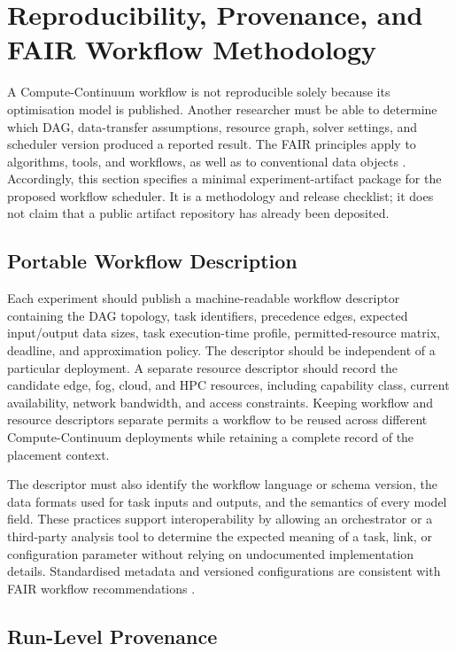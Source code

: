 \section{Reproducibility, Provenance, and FAIR Workflow Methodology}
\label{sec:reproducibility}

A Compute-Continuum workflow is not reproducible solely because its optimisation model is published. Another researcher must be able to determine which DAG, data-transfer assumptions, resource graph, solver settings, and scheduler version produced a reported result. The FAIR principles apply to algorithms, tools, and workflows, as well as to conventional data objects \cite{wilkinson2016fair}. Accordingly, this section specifies a minimal experiment-artifact package for the proposed workflow scheduler. It is a methodology and release checklist; it does not claim that a public artifact repository has already been deposited.

\subsection{Portable Workflow Description}

Each experiment should publish a machine-readable workflow descriptor containing the DAG topology, task identifiers, precedence edges, expected input/output data sizes, task execution-time profile, permitted-resource matrix, deadline, and approximation policy. The descriptor should be independent of a particular deployment. A separate resource descriptor should record the candidate edge, fog, cloud, and HPC resources, including capability class, current availability, network bandwidth, and access constraints. Keeping workflow and resource descriptors separate permits a workflow to be reused across different Compute-Continuum deployments while retaining a complete record of the placement context.

The descriptor must also identify the workflow language or schema version, the data formats used for task inputs and outputs, and the semantics of every model field. These practices support interoperability by allowing an orchestrator or a third-party analysis tool to determine the expected meaning of a task, link, or configuration parameter without relying on undocumented implementation details. Standardised metadata and versioned configurations are consistent with FAIR workflow recommendations \cite{devisser2023fairworkflows}.

\subsection{Run-Level Provenance}

